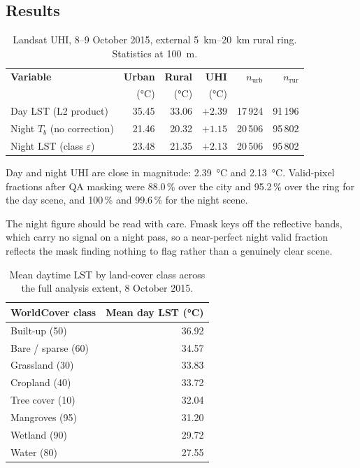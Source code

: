 \documentclass[11pt,a4paper]{article}
\begin{document}
\subsection{Results}
\label{sec:landsat_results}

\begin{table}[htbp]
\centering
\small
\begin{tabular}{lrrrrr}
\toprule
\textbf{Variable} & \textbf{Urban} & \textbf{Rural} &
\textbf{UHI} & $n_{\mathrm{urb}}$ & $n_{\mathrm{rur}}$ \\
 & (\si{\degreeCelsius}) & (\si{\degreeCelsius}) &
(\si{\degreeCelsius}) & & \\
\midrule
Day LST (L2 product)            & 35.45 & 33.06 & $+2.39$ & 17\,924 & 91\,196 \\
Night $T_b$ (no correction)       & 21.46 & 20.32 & $+1.15$ & 20\,506 & 95\,802 \\
Night LST (class $\varepsilon$) & 23.48 & 21.35 & $+2.13$ & 20\,506 & 95\,802 \\
\bottomrule
\end{tabular}
\caption{Landsat UHI, 8--9 October 2015, external
\SIrange{5}{20}{\kilo\metre} rural ring. Statistics at
\SI{100}{\metre}.}
\label{tab:landsat_uhi}
\end{table}

Day and night UHI are close in magnitude: \SI{2.39}{\degreeCelsius}
and \SI{2.13}{\degreeCelsius}. Valid-pixel fractions after QA masking
were 88.0\,\% over the city and 95.2\,\% over the ring for the day
scene, and 100\,\% and 99.6\,\% for the night scene.

The night figure should be read with care. Fmask keys off the
reflective bands, which carry no signal on a night pass, so a
near-perfect night valid fraction reflects the mask finding nothing to
flag rather than a genuinely clear scene.

\begin{table}[htbp]
\centering
\begin{tabular}{lr}
\toprule
\textbf{WorldCover class} & \textbf{Mean day LST (\si{\degreeCelsius})} \\
\midrule
Built-up (50)        & 36.92 \\
Bare / sparse (60)   & 34.57 \\
Grassland (30)       & 33.83 \\
Cropland (40)        & 33.72 \\
Tree cover (10)      & 32.04 \\
Mangroves (95)       & 31.20 \\
Wetland (90)         & 29.72 \\
Water (80)           & 27.55 \\
\bottomrule
\end{tabular}
\caption{Mean daytime LST by land-cover class across the full analysis
extent, 8 October 2015.}
\label{tab:byclass}
\end{table}
\end{document}
